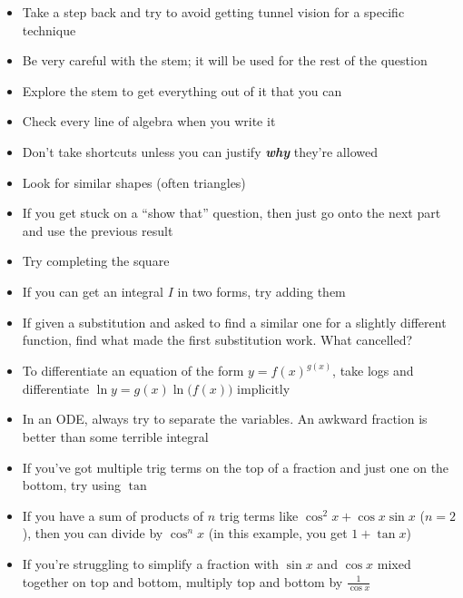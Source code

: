 \documentclass[../main.tex]{subfile}
\begin{document}


\begin{itemize}
	\item Take a step back and try to avoid getting tunnel vision for a specific technique
	\item Be very careful with the stem; it will be used for the rest of the question
	\item Explore the stem to get everything out of it that you can
	\item Check every line of algebra when you write it
	\item Don't take shortcuts unless you can justify {\Large\textit{\textbf{why}}} they're allowed
	\item Look for similar shapes (often triangles)
	\item If you get stuck on a \enquote{show that} question, then just go onto the next part and use the previous result
	\item Try completing the square
\end{itemize}


\begin{itemize}
	\item If you can get an integral $I$ in two forms, try adding them
	\item If given a substitution and asked to find a similar one for a slightly different function, find what made the first substitution work. What cancelled?
	\item To differentiate an equation of the form $y = f(x)^{g(x)}$, take logs and differentiate $\ln y = g(x) \ln\big(f(x)\big)$ implicitly
	\item In an ODE, always try to separate the variables. An awkward fraction is better than some terrible integral
\end{itemize}


\begin{itemize}
	\item If you've got multiple trig terms on the top of a fraction and just one on the bottom, try using $\tan$
	\item If you have a sum of products of $n$ trig terms like $\cos^2 x + \cos x\sin x$ ($n = 2$), then you can divide by $\cos^n x$ (in this example, you get $1 + \tan x$)
	\item If you're struggling to simplify a fraction with $\sin x$ and $\cos x$ mixed together on top and bottom, multiply top and bottom by $\frac{1}{\cos x}$
\end{itemize}
\end{document}
